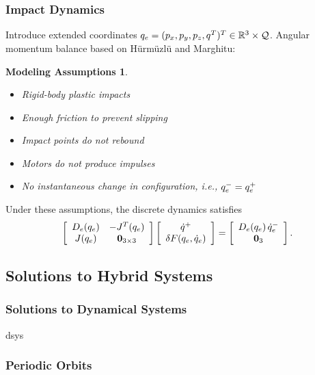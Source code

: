 \documentclass{beamer}
\newtheorem{massump}{Modeling Assumptions}
\begin{document}
\begin{frame}
\begin{columns}
\begin{column}{.45\textwidth}
\begin{figure}
      \end{figure}
    \end{column}
  \end{columns}
\end{frame}

\begin{frame}
  \frametitle{Impact Dynamics}
  Introduce extended coordinates $q_{e} = (p_{x}, p_{y}, p_{z}, q^{T})^{T} \in \mathbb{R}^{3} \times \mathcal{Q}$. Angular momentum balance based on H{\"u}rm{\"u}zl{\"u} and Marghitu:
  \begin{massump}
    \begin{itemize}
    \item Rigid-body plastic impacts
    \item Enough friction to prevent slipping
    \item Impact points do not rebound
    \item Motors do not produce impulses
    \item No instantaneous change in configuration, i.e., $q_{e}^{-} = q_{e}^{+}$
    \end{itemize}
  \end{massump}
  Under these assumptions, the discrete dynamics satisfies
  \begin{align*}
    \left[\begin{array}{c c}
        D_{e}(q_{e}) & -J^{T}(q_{e})\\
        J(q_{e}) & \mathbf{0}_{3 \times 3}
      \end{array}\right]
    \left[\begin{array}{c}
        \dot q^{+}\\
        \delta F(q_{e}, \dot q_{e})
      \end{array}\right]
    = \left[\begin{array}{c c}
        D_{e}(q_{e}) \, \dot q_{e}^{-}\\
        \mathbf{0}_{3}
      \end{array}\right].
  \end{align*}
\end{frame}

\subsection{Solutions to Hybrid Systems}
\begin{frame}
  \frametitle{Solutions to Dynamical Systems}
  dsys
\end{frame}

\begin{frame}
  \frametitle{Periodic Orbits}
\end{frame}
\end{document}
